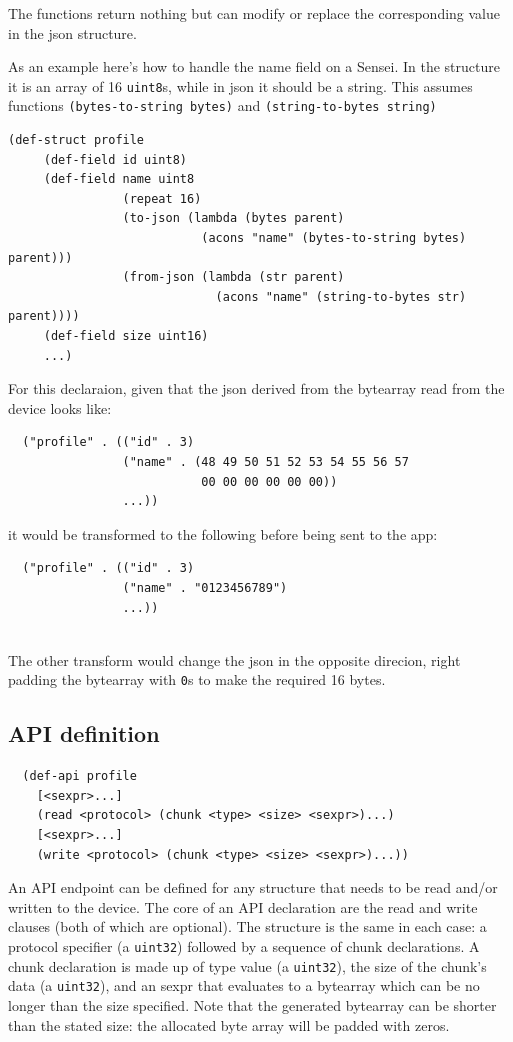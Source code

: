 \documentclass[12pt]{article}
\begin{document}
The functions return nothing but can modify or replace the
corresponding value in the json structure.

As an example here's how to handle the name field on a Sensei. In the
structure it is an array of 16 \verb|uint8|s, while in json it should
be a string. This assumes functions \verb|(bytes-to-string bytes)| and
\verb|(string-to-bytes string)|

\begin{verbatim} 
(def-struct profile
     (def-field id uint8)
     (def-field name uint8 
                (repeat 16)
                (to-json (lambda (bytes parent)
                           (acons "name" (bytes-to-string bytes) parent)))
                (from-json (lambda (str parent)
                             (acons "name" (string-to-bytes str) parent))))
     (def-field size uint16)
     ...)
\end{verbatim}

\noindent For this declaraion, given that the json derived from the
bytearray read from the device looks like:

\begin{verbatim}
  ("profile" . (("id" . 3)
                ("name" . (48 49 50 51 52 53 54 55 56 57 
                           00 00 00 00 00 00))
                ...))
\end{verbatim}

\noindent it would be transformed to the following before being sent
to the app:

\begin{verbatim}
  ("profile" . (("id" . 3)
                ("name" . "0123456789")
                ...))
 
\end{verbatim}

\noindent The other transform would change the json in the opposite
direcion, right padding the bytearray with \verb|0|s to make the
required 16 bytes.

\subsection{API definition}

\begin{verbatim}
  (def-api profile
    [<sexpr>...]
    (read <protocol> (chunk <type> <size> <sexpr>)...)
    [<sexpr>...]
    (write <protocol> (chunk <type> <size> <sexpr>)...))
\end{verbatim}

\noindent An API endpoint can be defined for any structure that needs
to be read and/or written to the device. The core of an API
declaration are the read and write clauses (both of which are
optional). The structure is the same in each case: a protocol specifier
(a \verb|uint32|) followed by a sequence of chunk declarations. A chunk
declaration is made up of type value (a \verb|uint32|), the size of the chunk's
data (a \verb|uint32|), and an sexpr that evaluates to a bytearray which can be
no longer than the size specified. Note that the generated bytearray
can be shorter than the stated size: the allocated byte array will be
padded with zeros.
\end{document}
